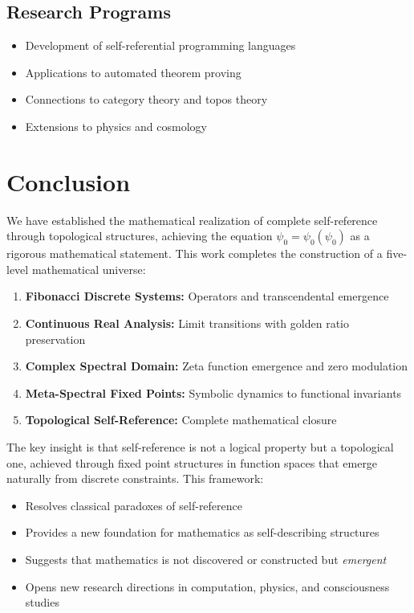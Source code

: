 \documentclass[12pt]{article}
\theoremstyle{plain}
\theoremstyle{definition}
\begin{document}
\subsection{Research Programs}
\begin{itemize}
\item Development of self-referential programming languages
\item Applications to automated theorem proving
\item Connections to category theory and topos theory
\item Extensions to physics and cosmology
\end{itemize}

\section{Conclusion}

We have established the mathematical realization of complete self-reference through topological structures, achieving the equation $\psi_0 = \psi_0(\psi_0)$ as a rigorous mathematical statement. This work completes the construction of a five-level mathematical universe:

\begin{enumerate}
\item \textbf{Fibonacci Discrete Systems:} Operators and transcendental emergence
\item \textbf{Continuous Real Analysis:} Limit transitions with golden ratio preservation  
\item \textbf{Complex Spectral Domain:} Zeta function emergence and zero modulation
\item \textbf{Meta-Spectral Fixed Points:} Symbolic dynamics to functional invariants
\item \textbf{Topological Self-Reference:} Complete mathematical closure
\end{enumerate}

The key insight is that self-reference is not a logical property but a topological one, achieved through fixed point structures in function spaces that emerge naturally from discrete constraints. This framework:

\begin{itemize}
\item Resolves classical paradoxes of self-reference
\item Provides a new foundation for mathematics as self-describing structures
\item Suggests that mathematics is not discovered or constructed but \emph{emergent}
\item Opens new research directions in computation, physics, and consciousness studies
\end{itemize}
\end{document}
